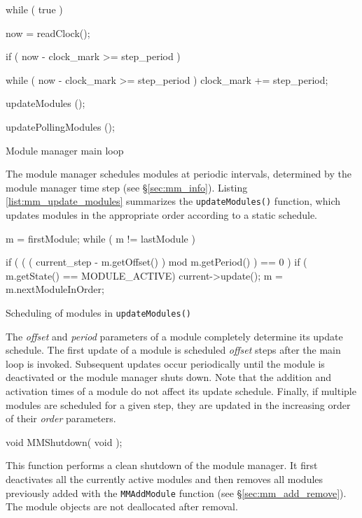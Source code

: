 \begin{codefloat}
\begin{codesegment}
  while ( true ) {
    now = readClock();

    if ( now - clock_mark >= step_period ) {
      while ( now - clock_mark >= step_period )
        clock_mark += step_period;

      updateModules ();
    }
    updatePollingModules ();
  }
\end{codesegment}
\caption{Module manager main loop}
\label{list:mm_main_loop}
\end{codefloat}

The module manager schedules modules at periodic intervals, determined by
the module manager time step (see \S\ref{sec:mm_info}). Listing
\ref{list:mm_update_modules} summarizes the {\tt updateModules()} function,
which updates modules in the appropriate order according to a static
schedule.

\begin{codefloat}
\begin{codesegment}
  m = firstModule;
  while ( m != lastModule ) {

    if ( ( ( current_step - m.getOffset() ) mod m.getPeriod() ) == 0 ) {
      if ( m.getState() == MODULE_ACTIVE)
        current->update();
      m = m.nextModuleInOrder;
    }
  }
\end{codesegment}
\caption{Scheduling of modules in {\tt updateModules()}}
\label{list:mm_update_modules}
\end{codefloat}

\noindent The {\it offset} and {\it period} parameters of a module completely determine its update
schedule. The first update of a module is scheduled {\it offset} steps after
the main loop is invoked. Subsequent updates occur periodically until the
module is deactivated or the module manager shuts down. Note that the
addition and activation times of a module do not affect its update
schedule. Finally, if multiple modules are scheduled for a given step, they
are updated in the increasing order of their {\it order} parameters.

\begin{prototype}
void MMShutdown( void );
\end{prototype}

This function performs a clean shutdown of the module manager. It first
deactivates all the currently active modules and then removes all modules
previously added with the {\tt MMAddModule} function (see
\S\ref{sec:mm_add_remove}). The module objects are not deallocated after
removal.

